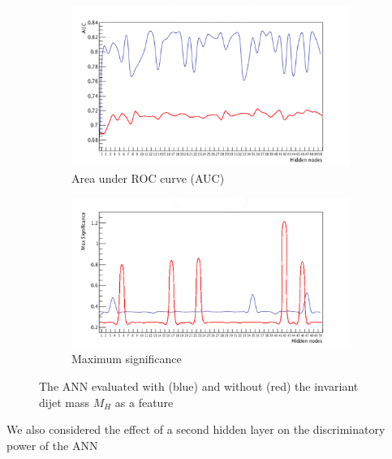 \begin{figure}[htbp]
	\centering
	\begin{subfigure}{0.49\textwidth}
	      \includegraphics[width=\textwidth]{img/auc_1}
	      \caption{Area under ROC curve (AUC)}
	\end{subfigure}
	\begin{subfigure}{0.49\textwidth}
		  \includegraphics[width=\textwidth]{img/sig_1}
		  \caption{Maximum significance}
	\end{subfigure}
	\caption{The ANN evaluated with (blue) and without (red) the invariant dijet mass $M_H$ as a feature }
	\label{fig:mhcomp}
\end{figure}

We also considered the effect of a second hidden layer on the discriminatory power of the ANN